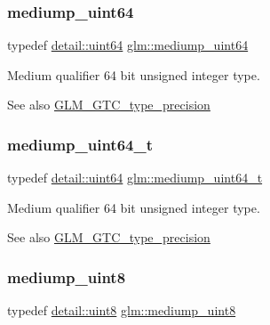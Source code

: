 \subsubsection{\texorpdfstring{mediump\+\_\+uint64}{mediump\_uint64}}
{\footnotesize\ttfamily typedef \hyperlink{namespaceglm_1_1detail_adec4b19bf4982125e122db2fe03c5810}{detail\+::uint64} \hyperlink{group__gtc__type__precision_ga6685788d15d0a973ee7c2460d0456dc1}{glm\+::mediump\+\_\+uint64}}

Medium qualifier 64 bit unsigned integer type. \begin{DoxySeeAlso}{See also}
\hyperlink{group__gtc__type__precision}{G\+L\+M\+\_\+\+G\+T\+C\+\_\+type\+\_\+precision} 
\end{DoxySeeAlso}
\mbox{\label{group__gtc__type__precision_gaa97354d3120a6dc029a5e9563723de18}} 
\subsubsection{\texorpdfstring{mediump\+\_\+uint64\+\_\+t}{mediump\_uint64\_t}}
{\footnotesize\ttfamily typedef \hyperlink{namespaceglm_1_1detail_adec4b19bf4982125e122db2fe03c5810}{detail\+::uint64} \hyperlink{group__gtc__type__precision_gaa97354d3120a6dc029a5e9563723de18}{glm\+::mediump\+\_\+uint64\+\_\+t}}

Medium qualifier 64 bit unsigned integer type. \begin{DoxySeeAlso}{See also}
\hyperlink{group__gtc__type__precision}{G\+L\+M\+\_\+\+G\+T\+C\+\_\+type\+\_\+precision} 
\end{DoxySeeAlso}
\mbox{\label{group__gtc__type__precision_gac4b849eaac0543a10f97f4bdda4850a8}} 
\subsubsection{\texorpdfstring{mediump\+\_\+uint8}{mediump\_uint8}}
{\footnotesize\ttfamily typedef \hyperlink{namespaceglm_1_1detail_aef2588f97d090cc19fbbe0c74fe17c8f}{detail\+::uint8} \hyperlink{group__gtc__type__precision_gac4b849eaac0543a10f97f4bdda4850a8}{glm\+::mediump\+\_\+uint8}}

